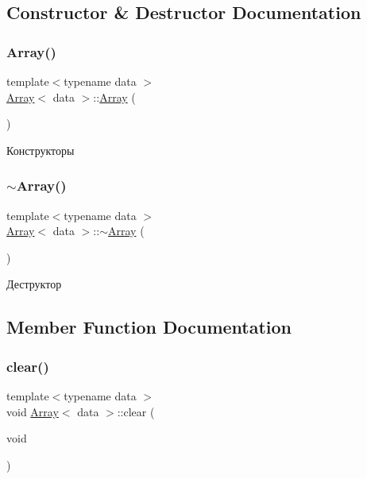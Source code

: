 \subsection{Constructor \& Destructor Documentation}
\mbox{\label{classArray_a2a76209eb40074ca13f2925ac9c7097b}} 
\subsubsection{\texorpdfstring{Array()}{Array()}}
{\footnotesize\ttfamily template$<$typename data $>$ \\
\hyperlink{classArray}{Array}$<$ data $>$\+::\hyperlink{classArray}{Array} (\begin{DoxyParamCaption}{ }\end{DoxyParamCaption})}

Конструкторы \mbox{\label{classArray_a29abd12e3f378562dc5f316538d2f8f9}} 
\subsubsection{\texorpdfstring{$\sim$\+Array()}{~Array()}}
{\footnotesize\ttfamily template$<$typename data $>$ \\
\hyperlink{classArray}{Array}$<$ data $>$\+::$\sim$\hyperlink{classArray}{Array} (\begin{DoxyParamCaption}{ }\end{DoxyParamCaption})}

Деструктор 

\subsection{Member Function Documentation}
\mbox{\label{classArray_ae0438c745ed382fecc0467222b1a028b}} 
\subsubsection{\texorpdfstring{clear()}{clear()}}
{\footnotesize\ttfamily template$<$typename data $>$ \\
void \hyperlink{classArray}{Array}$<$ data $>$\+::clear (\begin{DoxyParamCaption}\item[{void}]{ }\end{DoxyParamCaption})}

